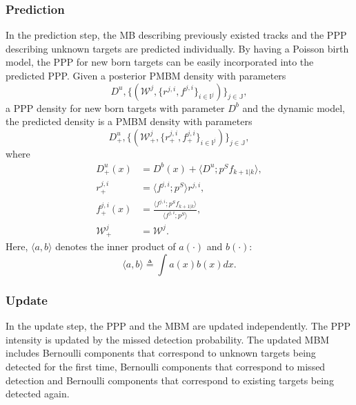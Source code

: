 \subsubsection{Prediction}
In the prediction step, the MB describing previously existed tracks and the PPP describing unknown targets are predicted individually. By having a Poisson birth model, the PPP for new born targets can be easily incorporated into the predicted PPP. Given a posterior PMBM density with parameters
\begin{equation}
    D^u, \{(\mathcal{W}^j,\{r^{j,i},f^{j,i}\}_{i\in\mathbb{I}^j})\}_{j\in\mathbb{J}}, 
\end{equation}
a PPP density for new born targets with parameter $D^b$ and the dynamic model, the predicted density is a PMBM density with parameters \cite{pmbmextended2}
\begin{equation}
    D^u_+, \{(\mathcal{W}^j_+,\{r^{j,i}_+,f^{j,i}_+\}_{i\in\mathbb{I}^j})\}_{j\in\mathbb{J}}, 
    \label{eq:pmbmpara}
\end{equation}
where
\begin{subequations}
\begin{align}
D^u_+(x) &= D^b(x) + \langle D^u;p^Sf_{k+1|k}\rangle,\\
r^{j,i}_+ &= \langle f^{j,i};p^S\rangle r^{j,i},\\
f^{j,i}_+(x) &= \frac{\langle f^{j,i};p^Sf_{k+1|k}\rangle}{\langle f^{j,i};p^S\rangle},\\
\mathcal{W}^j_+ &= \mathcal{W}^j.
\end{align}
\end{subequations}
Here, $\langle a,b\rangle$ denotes the inner product of $a(\cdot)$ and $b(\cdot)$:
\begin{equation}
    \langle a,b\rangle \triangleq \int a(x)b(x)dx.
\end{equation}



\subsubsection{Update}
In the update step, the PPP and the MBM are updated independently.
The PPP intensity is updated by the missed detection probability. The updated MBM includes Bernoulli components that correspond to unknown targets being detected for the first time, Bernoulli components that correspond to missed detection and Bernoulli components that correspond to existing targets being detected again.

